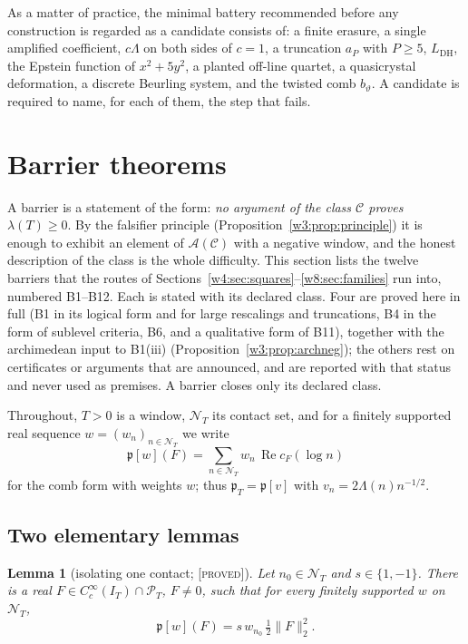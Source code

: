 \documentclass[11pt]{amsart}
\newtheorem{lemma}[theorem]{Lemma}
\theoremstyle{definition}
\theoremstyle{remark}
\numberwithin{equation}{section}
\DeclareMathOperator{\Rel}{Re}
\newcommand{\IT}{I_T}                                  %
\newcommand{\cF}{c_F}                                  %
\newcommand{\PT}{\mathcal{P}_T}                        %
\newcommand{\NT}{\mathcal{N}_T}                        %
\newcommand{\pT}{\mathfrak{p}_T}                       %
\newcommand{\lam}{\lambda(T)}                          %
\newcommand{\stag}[1]{\textsc{[#1]}}
\newcommand{\PROVED}{\stag{proved}}
\begin{document}
As a matter of practice, the minimal battery recommended before any construction is regarded as a candidate
consists of: a finite erasure, a single amplified coefficient, $c\Lambda$ on both sides of $c=1$, a truncation
$a_P$ with $P\ge5$, $L_{\mathrm{DH}}$, the Epstein function of $x^2+5y^2$, a planted off-line quartet, a
quasicrystal deformation, a discrete Beurling system, and the twisted comb $b_\vartheta$. A candidate is
required to name, for each of them, the step that fails.


\section{Barrier theorems}\label{w3:sec:barriers}

A barrier is a statement of the form: \emph{no argument of the class $\mathcal C$ proves $\lam\ge0$}. By the
falsifier principle (Proposition~\ref{w3:prop:principle}) it is enough to exhibit an element of
$\mathcal A(\mathcal C)$ with a negative window, and the honest description of the class is the whole
difficulty. This section lists the twelve barriers that the routes of Sections~\ref{w4:sec:squares}--\ref{w8:sec:families} run into, numbered
B1--B12. Each is stated with its declared class. Four are proved here in full (B1 in its logical form and for
large rescalings and truncations, B4 in the form of sublevel criteria, B6, and a qualitative form of B11), together with the archimedean
input to B1(iii) (Proposition~\ref{w3:prop:archneg}); the others rest on certificates or arguments that are announced, and are reported with
that status and never used as premises. A barrier closes only its declared class.

Throughout, $T>0$ is a window, $\NT$ its contact set, and for a finitely supported real sequence
$w=(w_n)_{n\in\NT}$ we write
\[
  \mathfrak p[w](F)=\sum_{n\in\NT}w_n\,\Rel\cF(\log n)
\]
for the comb form with weights $w$; thus $\pT=\mathfrak p[v]$ with $v_n=2\Lambda(n)n^{-1/2}$.

\subsection{Two elementary lemmas}\label{w3:subsec:lemmas}

\begin{lemma}[isolating one contact; \PROVED]\label{w3:lem:isolate}
Let $n_0\in\NT$ and $s\in\{1,-1\}$. There is a real $F\in C_c^\infty(\IT)\cap\PT$, $F\ne0$, such that for every
finitely supported $w$ on $\NT$,
\[
  \mathfrak p[w](F)=s\,w_{n_0}\,\tfrac12\|F\|_2^2 .
\]
\end{lemma}
\end{document}
